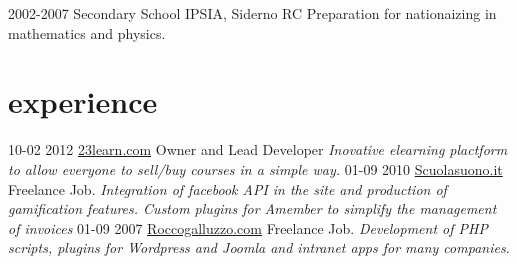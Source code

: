 \documentclass[]{cv}
\begin{document}
\begin{entrylist}

  \entry
    {2002-2007}
    {Secondary School}
    {IPSIA, Siderno RC}
    {Preparation for nationaizing in mathematics and physics.}

\end{entrylist}

\section{experience}

\begin{entrylist}
  \entry
    {10-02 2012}
     {\href{http://www.23learn.com}{23learn.com}}
    {Owner and Lead Developer}
    {\emph{Inovative elearning plactform to allow everyone to sell/buy courses in a simple way. }}
  \entry
    {01-09 2010}
    {\href{http://www.scuolasuono.it}{Scuolasuono.it}}
    {Freelance Job.}
    {\emph{Integration of facebook API in the site and production of gamification features. Custom plugins for Amember to simplify the management of invoices}}
  \entry
    {01-09 2007}
    {\href{http://roccogalluzzo.com}{Roccogalluzzo.com}}
    {Freelance Job.}
    {\emph{Development of PHP scripts, plugins for Wordpress and Joomla and intranet apps for many companies.}}
\end{entrylist}
\end{document}
